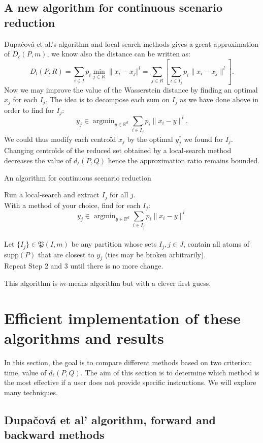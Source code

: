 \documentclass{amsart}
\newcommand{\argmin}{\mathop{\arg\min}}
\newcommand{\RR}{\mathbb{R}}
\begin{document}
\subsection{A new algorithm for continuous scenario reduction}
Dupačová et al.'s algorithm and local-search methods gives a great approximation of $D_\ell\left(P,m\right)$, we know also the distance can be written as:
$$D_l\left(P,R\right)=\sum_{i\in I}p_i\min_{j\in R}\lVert x_i-x_j\Vert^l=\sum_{j\in R}\left[\sum_{i\in I_j}p_i\lVert x_i-x_j\rVert^l\right].$$
Now we may improve the value of the Wasserstein distance by finding an optimal $x_j$ for each $I_j$. The idea is to decompose each sum on $I_j$ as we have done above in order to find for $I_j$: 
$$
y_j\in \argmin_{y\in\RR^d}\sum_{i\in I_j}p_i\lVert x_i-y\rVert^l.
$$
We could thus modify each centroïd $x_j$ by the optimal $y^*_j$ we found for $I_j$. Changing centroïds of the reduced set obtained by a local-search method decreases the value of $d_\ell\left(P,Q\right)$ hence the approximation ratio remains bounded. 

\begin{algorithm}[h]\caption{An algorithm for continuous scenario reduction}
    \label{improved ls}
    Run a local-search and extract $I_j$ for all $j$. \\
    With a method of your choice, find for each $I_j$: $$y_j\in\argmin_{y\in\RR^d}\sum_{i\in I_j}p_i\lVert x_i-y\rVert^l$$
    \\ Let $\{I_j\}\in\mathfrak{P}\left(I,m\right)$ be any partition whose sets $I_j, j\in J$, contain all atoms of supp$\left(P\right)$ that are closest to $y_j$ (ties may be broken arbitrarily). \\
    Repeat Step 2 and 3 until there is no more change.
\end{algorithm}

This algorithm is $m$-means algorithm but with a clever first guess.

\section{Efficient implementation of these algorithms and results}\label{fast}
In this section, the goal is to compare different methods based on two criterion: time, value of $d_\ell\left(P,Q\right)$. The aim of this section is to determine which method is the most effective if a user does not provide specific instructions. We will explore many techniques. 
\subsection{Dupačová et al' algorithm, forward and backward methods}
\end{document}
